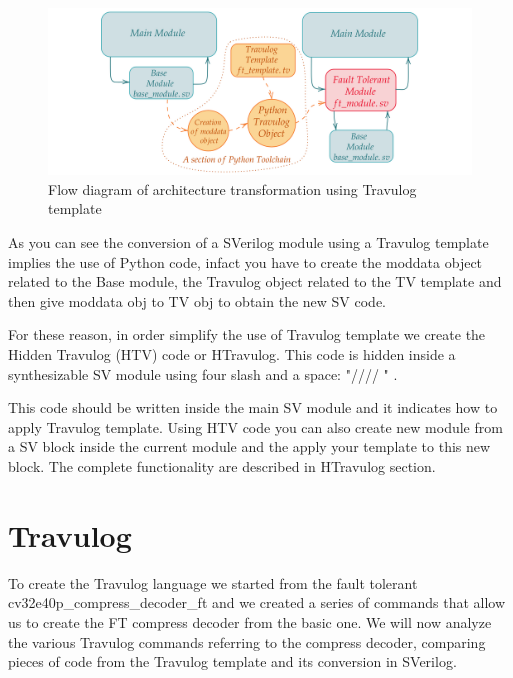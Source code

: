 {	\begin{figure}[H]
		\centering
		\includegraphics[scale=0.2,center]{./images/Travulog_flow_blocks.png}
		\caption{Flow diagram of architecture transformation using Travulog template}
		\label{fig:TravulogFlowBlocks}
	\end{figure} 
	
    As you can see the conversion of a SVerilog module using a Travulog template implies the use of Python code, infact you have to create the moddata object related to the Base module, the Travulog object related to the TV template and then give moddata obj to TV obj to obtain the new SV code.	
    
    For these reason, in order simplify the use of Travulog template we create the Hidden Travulog (HTV) code or HTravulog. This code is hidden inside a synthesizable SV module using four slash and a space: "//// " . 
    
    This code should be written inside the main SV module and it indicates how to apply Travulog template. Using HTV code you can also create new module from a SV block inside the current module and the apply your template to this new block. The complete functionality are described in HTravulog section. 
	

	
	
	\section{Travulog}{
	    \label{Travulog}
    	To create the Travulog language we started from the fault tolerant cv32e40p\_compress\_decoder\_ft and we created a series of commands that allow us to create the FT compress decoder from the basic one. We will now analyze the various Travulog commands referring to the compress decoder, comparing pieces of code from the Travulog template and its conversion in SVerilog.
	
}}
